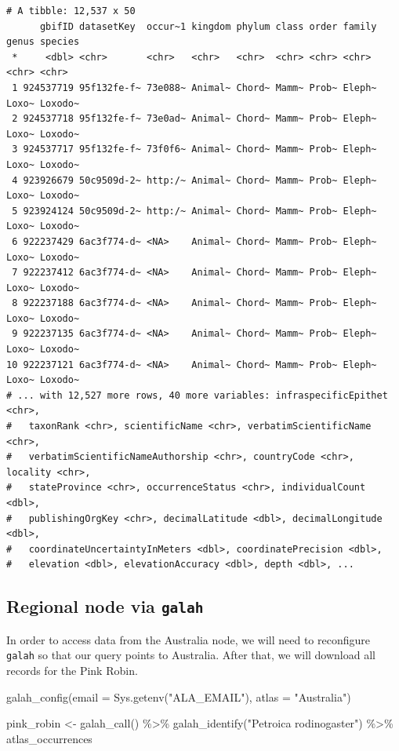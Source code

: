 \documentclass[
  letterpaper,
  DIV=11,
  numbers=noendperiod,
  oneside]{scrreprt}
\newenvironment{Shaded}{\begin{snugshade}}{\end{snugshade}}
\newcommand{\AttributeTok}[1]{\textcolor[rgb]{0.40,0.45,0.13}{#1}}
\newcommand{\FunctionTok}[1]{\textcolor[rgb]{0.28,0.35,0.67}{#1}}
\newcommand{\NormalTok}[1]{\textcolor[rgb]{0.00,0.23,0.31}{#1}}
\newcommand{\OtherTok}[1]{\textcolor[rgb]{0.00,0.23,0.31}{#1}}
\newcommand{\SpecialCharTok}[1]{\textcolor[rgb]{0.37,0.37,0.37}{#1}}
\newcommand{\StringTok}[1]{\textcolor[rgb]{0.13,0.47,0.30}{#1}}
\begin{document}
\begin{verbatim}
# A tibble: 12,537 x 50
      gbifID datasetKey  occur~1 kingdom phylum class order family genus species
 *     <dbl> <chr>       <chr>   <chr>   <chr>  <chr> <chr> <chr>  <chr> <chr>  
 1 924537719 95f132fe-f~ 73e088~ Animal~ Chord~ Mamm~ Prob~ Eleph~ Loxo~ Loxodo~
 2 924537718 95f132fe-f~ 73e0ad~ Animal~ Chord~ Mamm~ Prob~ Eleph~ Loxo~ Loxodo~
 3 924537717 95f132fe-f~ 73f0f6~ Animal~ Chord~ Mamm~ Prob~ Eleph~ Loxo~ Loxodo~
 4 923926679 50c9509d-2~ http:/~ Animal~ Chord~ Mamm~ Prob~ Eleph~ Loxo~ Loxodo~
 5 923924124 50c9509d-2~ http:/~ Animal~ Chord~ Mamm~ Prob~ Eleph~ Loxo~ Loxodo~
 6 922237429 6ac3f774-d~ <NA>    Animal~ Chord~ Mamm~ Prob~ Eleph~ Loxo~ Loxodo~
 7 922237412 6ac3f774-d~ <NA>    Animal~ Chord~ Mamm~ Prob~ Eleph~ Loxo~ Loxodo~
 8 922237188 6ac3f774-d~ <NA>    Animal~ Chord~ Mamm~ Prob~ Eleph~ Loxo~ Loxodo~
 9 922237135 6ac3f774-d~ <NA>    Animal~ Chord~ Mamm~ Prob~ Eleph~ Loxo~ Loxodo~
10 922237121 6ac3f774-d~ <NA>    Animal~ Chord~ Mamm~ Prob~ Eleph~ Loxo~ Loxodo~
# ... with 12,527 more rows, 40 more variables: infraspecificEpithet <chr>,
#   taxonRank <chr>, scientificName <chr>, verbatimScientificName <chr>,
#   verbatimScientificNameAuthorship <chr>, countryCode <chr>, locality <chr>,
#   stateProvince <chr>, occurrenceStatus <chr>, individualCount <dbl>,
#   publishingOrgKey <chr>, decimalLatitude <dbl>, decimalLongitude <dbl>,
#   coordinateUncertaintyInMeters <dbl>, coordinatePrecision <dbl>,
#   elevation <dbl>, elevationAccuracy <dbl>, depth <dbl>, ...
\end{verbatim}

\hypertarget{regional-node-via-galah}{%
\subsection{\texorpdfstring{Regional node via
\texttt{galah}}{Regional node via galah}}\label{regional-node-via-galah}}

In order to access data from the Australia node, we will need to
reconfigure \texttt{galah} so that our query points to Australia. After
that, we will download all records for the Pink Robin.

\begin{Shaded}
\begin{Highlighting}[]
\FunctionTok{galah\_config}\NormalTok{(}\AttributeTok{email =} \FunctionTok{Sys.getenv}\NormalTok{(}\StringTok{"ALA\_EMAIL"}\NormalTok{), }
             \AttributeTok{atlas =} \StringTok{"Australia"}\NormalTok{)}

\NormalTok{pink\_robin }\OtherTok{\textless{}{-}} \FunctionTok{galah\_call}\NormalTok{() }\SpecialCharTok{\%\textgreater{}\%} 
  \FunctionTok{galah\_identify}\NormalTok{(}\StringTok{"Petroica rodinogaster"}\NormalTok{) }\SpecialCharTok{\%\textgreater{}\%} 
\NormalTok{  atlas\_occurrences}
\end{Highlighting}
\end{Shaded}
\end{document}
